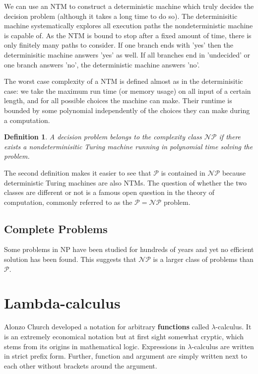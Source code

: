 \documentclass[11pt]{article}
\newtheorem{definition}{Definition}
\begin{document}
	\par 
	We can use an NTM to construct a deterministic machine which truly decides the decision problem (although it takes a long time to do so). The determinisitic machine systematically explores all execution paths the nondeterministic machine is capable of. As the NTM is bound to stop after a fixed amount of time, there is only finitely many paths to consider. If one branch ends with 'yes' then the determinisitic machine answers 'yes' as well. If all branches end in 'undecided' or one branch answers 'no', the deterministic machine answers 'no'.
	
	\par 
	The worst case complexity of a NTM is defined almost as in the determinisitic case: we take the maximum run time (or memory usage) on all input of a certain length, and for all possible choices the machine can make. Their runtime is bounded by some polynomial independently of the choices they can make during a computation.
	
	\begin{definition}
		A decision problem belongs to the complexity class $\mathcal{NP}$ if there exists a nondeterminisitic Turing machine running in polynomial time solving the problem.
	\end{definition}
	
	The second definition makes it easier to see that $\mathcal{P}$ is contained in $\mathcal{NP}$ because deterministic Turing machines are also NTMs. The question of whether the two classes are different or not is a famous open question in the theory of computation, commonly referred to as the $\mathcal{P} = \mathcal{NP}$ problem.
	
	\subsection{Complete Problems}
	Some problems in NP have been studied for hundreds of years and yet no efficient solution has been found. This suggests that $\mathcal{NP}$ is a larger class of problems than $\mathcal{P}$.
	
	
	
	\section{Lambda-calculus}
	Alonzo Church developed a notation for arbitrary \textbf{functions} called $\lambda$-calculus. It is an extremely economical notation but at first sight somewhat cryptic, which stems from its origins in mathematical logic. Expressions in $\lambda$-calculus are written in strict prefix form. Further, function and argument are simply written next to each other without brackets around the argument.
	
\end{document}
